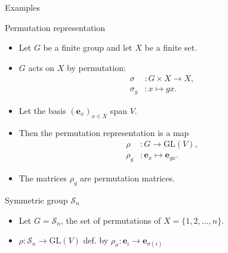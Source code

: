 \documentclass[handout, 10pt]{beamer}
\newcommand{\GL}{\text{GL}}
\newcommand{\Sym}{\mathcal{S}}
\newcommand{\bas}{\mathbf{e}}
\begin{document}
\begin{frame}[allowframebreaks]{Examples}
		\begin{block}{Permutation representation}
			\begin{itemize}
				\item Let $G$ be a finite group and let $X$ be a finite set.
				
				\item $G$ acts on $X$ by permutation:
				\begin{align*}
					\sigma &: G \times X \rightarrow X, \\
					\sigma_g &: x \mapsto gx.
				\end{align*}
				
				\item Let the basis $(\bas_x)_{x \in X}$ span $V$.
				
				\item Then the permutation representation is a map
				\begin{align*}
					\rho &: G \rightarrow \GL(V), \\
					\rho_g &: \bas_x \mapsto \bas_{gx}.
				\end{align*}
				
				\item The matrices $\rho_g$ are \alert{permutation matrices}.
			\end{itemize}
		\end{block}
		
		\begin{block}{Symmetric group $\Sym_n$}
			\begin{itemize}
				\item Let $G = \Sym_n$, the set of permutations of $X = \{1, 2, \dots, n\}$.
				
				\item $\rho : \Sym_n \rightarrow \GL(V)$ def. by $\rho_\sigma : \bas_i \rightarrow \bas_{\sigma(i)}$
				

\end{itemize}
\end{block}
\end{frame}
\end{document}
